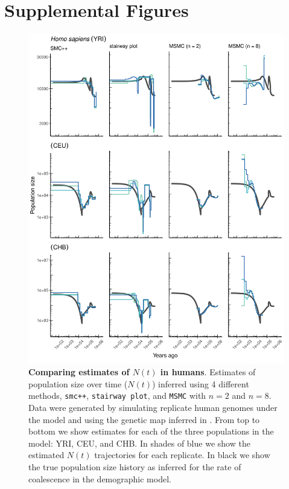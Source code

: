 \documentclass[12pt,halfline,a4paper]{ouparticle}
\newcommand{\beginsupplement}{%
        \setcounter{table}{0}
        \renewcommand{\thetable}{S\arabic{table}}%
        \renewcommand{\theHtable}{S\thetable}
        \setcounter{figure}{0}
        \renewcommand{\thefigure}{S\arabic{figure}}%
        \renewcommand{\theHfigure}{S\thefigure}
     }
\newcommand{\MSMC}{\texttt{MSMC}\xspace}
\newcommand{\smcpp}{\texttt{smc++}\xspace}
\newcommand{\stairwayplot}{\texttt{stairway plot}\xspace}
\begin{document}



\pagebreak
\beginsupplement
\section*{Supplemental Figures}
\begin{figure}
\begin{center}
\includegraphics[width=0.8\linewidth]{display_items/homo_sapiens_mask_Gutenkunst.png}
\caption{\textbf{Comparing estimates of $N(t)$ in humans}. Estimates of population
size over time ($N(t)$) inferred using 4 different methods, \smcpp, \stairwayplot, and
\MSMC with $n=2$ and $n=8$. Data were generated by simulating
replicate human genomes under the \cite{gutenkunst2009inferring} model and using the genetic map
inferred in \cite{international2007second}. From top to bottom we show estimates for each
of the three populations in the model: YRI, CEU, and CHB. In shades of blue we show the estimated
$N(t)$ trajectories for each replicate. In black we show the true population size history as inferred
for the rate of coalescence in the demographic model.}
\label{fig:n_t_gutenkunst}
\end{center}
\end{figure}
\end{document}

